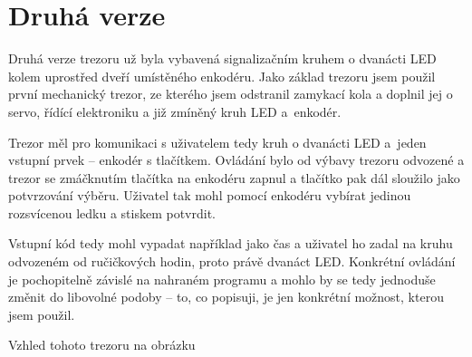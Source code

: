 \section{Druhá verze}

Druhá verze trezoru už byla vybavená signalizačním kruhem o dvanácti LED kolem uprostřed dveří
umístěného enkodéru. Jako základ trezoru jsem použil první mechanický trezor, %
 ze kterého jsem odstranil zamykací kola 
a doplnil jej o servo, řídící elektroniku a již zmíněný kruh LED a~enkodér.

Trezor měl pro komunikaci s uživatelem tedy kruh o dvanácti LED a~jeden vstupní prvek -- enkodér s tlačítkem.
Ovládání bylo od výbavy trezoru odvozené a trezor se zmáčknutím tlačítka na enkodéru zapnul a tlačítko pak dál sloužilo jako potvrzování výběru.
Uživatel tak mohl pomocí enkodéru vybírat jedinou rozsvícenou ledku a stiskem potvrdit. 

Vstupní kód tedy mohl vypadat 
například jako čas a uživatel ho zadal na kruhu odvozeném od ručičkových hodin, proto právě dvanáct LED.
Konkrétní ovládání je pochopitelně závislé na nahraném programu a mohlo by se tedy jednoduše změnit do libovolné podoby --
to, co popisuji, je jen konkrétní možnost, kterou jsem použil. 

Vzhled tohoto trezoru na obrázku 

\newpage